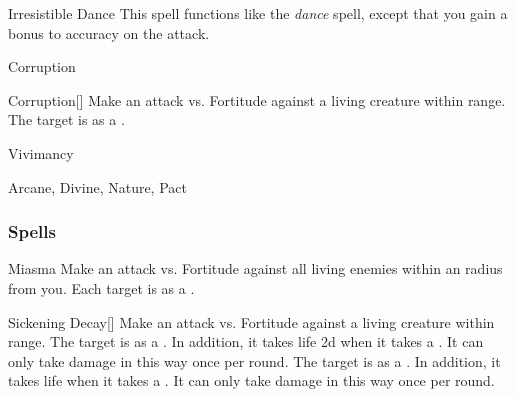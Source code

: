 \lowercase{\hypertarget{spell:Irresistible Dance}{}}\label{spell:Irresistible Dance}
\begin{ability}[\nth{6}]{\hypertarget{spell:Irresistible Dance}{Irresistible Dance}}
This spell functions like the \textit{dance} spell, except that you gain a  bonus to accuracy on the attack.
\end{ability}
\vspace{0.25em}


\newpage
\begin{spellsection}{Corruption}

\begin{spellheader}
\end{spellheader}


\begin{ability}{Corruption}[]
Make an attack vs. Fortitude against a living creature within \rngclose range.
\hit The target is  as a .
\end{ability}




 Vivimancy

 Arcane, Divine, Nature, Pact
\end{spellsection}


\subsubsection{Spells}


\lowercase{\hypertarget{spell:Miasma}{}}\label{spell:Miasma}
\begin{ability}[\nth{1}]{\hypertarget{spell:Miasma}{Miasma}}
Make an attack vs. Fortitude against all living enemies within an \areamed radius from you.
\hit Each target is  as a .
\end{ability}
\vspace{0.25em}



\lowercase{\hypertarget{spell:Sickening Decay}{}}\label{spell:Sickening Decay}
\begin{ability}[\nth{1}]{\hypertarget{spell:Sickening Decay}{Sickening Decay}}[]
Make an attack vs. Fortitude against a living creature within \rngclose range.
\hit The target is  as a .
In addition, it takes life  \minus2d when it takes a .
It can only take damage in this way once per round.
\crit The target is  as a .
In addition, it takes life  when it takes a .
It can only take damage in this way once per round.
\end{ability}
\vspace{0.25em}




